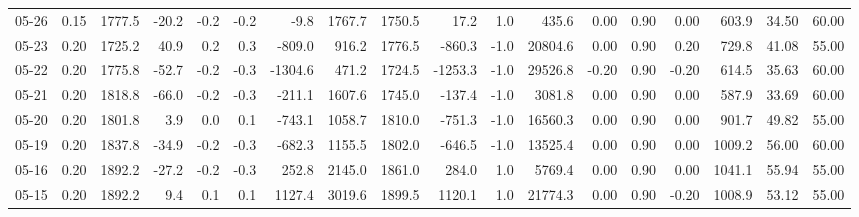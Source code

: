 \begin{threeparttable}
{\begin{tabular}{lrrrrrrrrrrrrrrrrr}
  05-26 &     0.15 & 1777.5 &             -20.2 &              -0.2 &               -0.2 &               -9.8 & 1767.7 & 1750.5 &       17.2 &                      1.0 &               435.6 &       0.00 &      0.90 &           0.00 &            603.9 &           34.50 &                  60.00 \\
  05-23 &     0.20 & 1725.2 &              40.9 &               0.2 &                0.3 &             -809.0 &  916.2 & 1776.5 &     -860.3 &                     -1.0 &             20804.6 &       0.00 &      0.90 &           0.20 &            729.8 &           41.08 &                  55.00 \\
  05-22 &     0.20 & 1775.8 &             -52.7 &              -0.2 &               -0.3 &            -1304.6 &  471.2 & 1724.5 &    -1253.3 &                     -1.0 &             29526.8 &      -0.20 &      0.90 &          -0.20 &            614.5 &           35.63 &                  60.00 \\
  05-21 &     0.20 & 1818.8 &             -66.0 &              -0.2 &               -0.3 &             -211.1 & 1607.6 & 1745.0 &     -137.4 &                     -1.0 &              3081.8 &       0.00 &      0.90 &           0.00 &            587.9 &           33.69 &                  60.00 \\
  05-20 &     0.20 & 1801.8 &               3.9 &               0.0 &                0.1 &             -743.1 & 1058.7 & 1810.0 &     -751.3 &                     -1.0 &             16560.3 &       0.00 &      0.90 &           0.00 &            901.7 &           49.82 &                  55.00 \\
  05-19 &     0.20 & 1837.8 &             -34.9 &              -0.2 &               -0.3 &             -682.3 & 1155.5 & 1802.0 &     -646.5 &                     -1.0 &             13525.4 &       0.00 &      0.90 &           0.00 &           1009.2 &           56.00 &                  60.00 \\
  05-16 &     0.20 & 1892.2 &             -27.2 &              -0.2 &               -0.3 &              252.8 & 2145.0 & 1861.0 &      284.0 &                      1.0 &              5769.4 &       0.00 &      0.90 &           0.00 &           1041.1 &           55.94 &                  55.00 \\
  05-15 &     0.20 & 1892.2 &               9.4 &               0.1 &                0.1 &             1127.4 & 3019.6 & 1899.5 &     1120.1 &                      1.0 &             21774.3 &       0.00 &      0.90 &          -0.20 &           1008.9 &           53.12 &                  55.00 \\

\end{tabular}}
\end{threeparttable}

